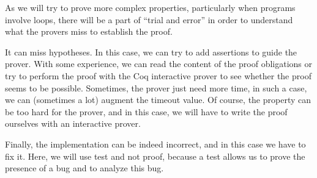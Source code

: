 


As we will try to prove more complex properties, particularly when
programs involve loops, there will be a part of ``trial and error'' in
order to understand what the provers miss to establish the proof.

It can miss hypotheses. In this case, we can try to add assertions to
guide the prover. With some experience, we can read the content of the
proof obligations or try to perform the proof with the Coq interactive
prover to see whether the proof seems to be possible. Sometimes, the
prover just need more time, in such a case, we can (sometimes a lot)
augment the timeout value. Of course, the property can be too hard for
the prover, and in this case, we will have to write the proof ourselves
with an interactive prover.

Finally, the implementation can be indeed incorrect, and in this case we
have to fix it. Here, we will use test and not proof, because a test
allows us to prove the presence of a bug and to analyze this bug.
